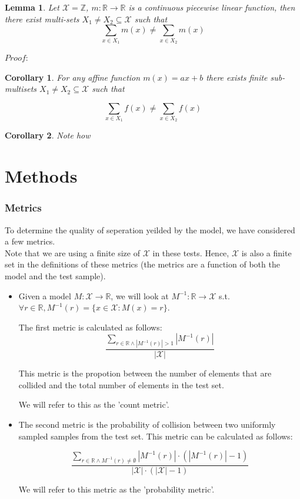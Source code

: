 \documentclass{article}
\newtheorem{lemma}[theorem]{Lemma}
\newtheorem{corollary}{Corollary}[theorem]
\begin{document}
\begin{lemma}
    Let $\mathcal{X}=\mathbb{Z}$, $m:\mathbb{R}\to\mathbb{R}$ is a continuous piecewise linear function,
    then there exist multi-sets $X_1 \neq X_2 \subseteq \mathcal{X}$ such that \\
    \[ \sum_{x\in X_1}m(x) \neq \sum_{x\in X_2}m(x) \]

\end{lemma}
$Proof:$ \\



\begin{corollary}
For any affine function $m(x) = ax + b $ there exists finite sub-multisets $X_1 \neq X_2 \subseteq \mathcal{X}$ such that

\[ \sum_{x\in X_1}f(x) \neq \sum_{x\in X_2}f(x) \]
\end{corollary}
\begin{corollary}
Note how 
\end{corollary}



\part*{Methods}
\section*{Metrics}
To determine the quality of seperation yeilded by the model, we have considered a few metrics.\\
Note that we are using a finite size of $\mathcal{X}$ in these tests. Hence, $\mathcal{X}$
is also a finite set in the definitions of these metrics (the metrics are a function of both the model and the test sample).
\begin{itemize}
    \item Given a model $M:\mathcal{X}\rightarrow\mathbb{R}$, 
    we will look at $M^{-1}:\mathbb{R}\rightarrow\mathcal{X}$ s.t. 
    $\forall r\in\mathbb{R}, M^{-1}(r)=\{x\in\mathcal{X}:M(x)=r\}$.

    The first metric is calculated as follows:
    \[
        \frac{\sum_{r\in\mathbb{R}\wedge |M^{-1}(r)|>1}|M^{-1}(r)|}
        {|\mathcal{X}|}
    \]

    This metric is the propotion between the number of elements 
    that are collided and the total number of elements in the test set.
    
    We will refer to this as the 'count metric'.

    \item The second metric is the probability of collision
    between two uniformly sampled samples from the test set.
    This metric can be calculated as follows:

    \[
        \frac{\sum_{r\in\mathbb{R}\wedge M^{-1}(r)\neq\emptyset}|M^{-1}(r)|\cdot\left(|M^{-1}(r)|-1\right)}
        {|\mathcal{X}|\cdot\left(|\mathcal{X}|-1\right)}
    \]

    We will refer to this metric as the 'probability metric'.
\end{itemize}
\end{document}
